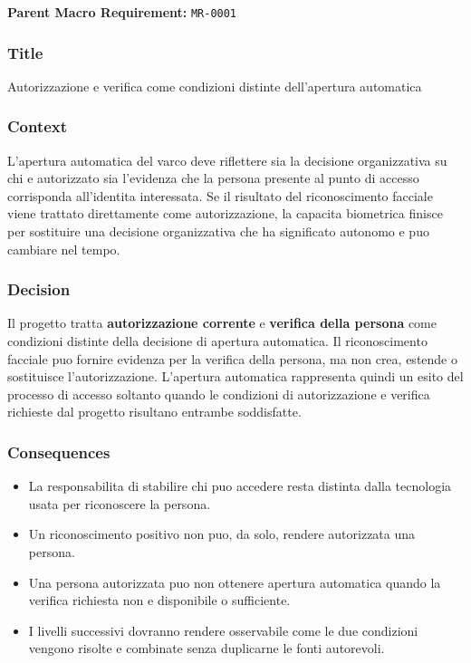 \documentclass[
  10pt,
]{article}
\providecommand{\tightlist}{%
  \setlength{\itemsep}{0pt}\setlength{\parskip}{0pt}}
\begin{document}
\textbf{Parent Macro Requirement:} \texttt{MR-0001}

\subsubsection{Title}\label{title}

Autorizzazione e verifica come condizioni distinte dell'apertura
automatica

\subsubsection{Context}\label{context}

L'apertura automatica del varco deve riflettere sia la decisione
organizzativa su chi e autorizzato sia l'evidenza che la persona
presente al punto di accesso corrisponda all'identita interessata. Se il
risultato del riconoscimento facciale viene trattato direttamente come
autorizzazione, la capacita biometrica finisce per sostituire una
decisione organizzativa che ha significato autonomo e puo cambiare nel
tempo.

\subsubsection{Decision}\label{decision}

Il progetto tratta \textbf{autorizzazione corrente} e \textbf{verifica
della persona} come condizioni distinte della decisione di apertura
automatica. Il riconoscimento facciale puo fornire evidenza per la
verifica della persona, ma non crea, estende o sostituisce
l'autorizzazione. L'apertura automatica rappresenta quindi un esito del
processo di accesso soltanto quando le condizioni di autorizzazione e
verifica richieste dal progetto risultano entrambe soddisfatte.

\subsubsection{Consequences}\label{consequences}

\begin{itemize}
\tightlist
\item
  La responsabilita di stabilire chi puo accedere resta distinta dalla
  tecnologia usata per riconoscere la persona.
\item
  Un riconoscimento positivo non puo, da solo, rendere autorizzata una
  persona.
\item
  Una persona autorizzata puo non ottenere apertura automatica quando la
  verifica richiesta non e disponibile o sufficiente.
\item
  I livelli successivi dovranno rendere osservabile come le due
  condizioni vengono risolte e combinate senza duplicarne le fonti
  autorevoli.
\end{itemize}
\end{document}
